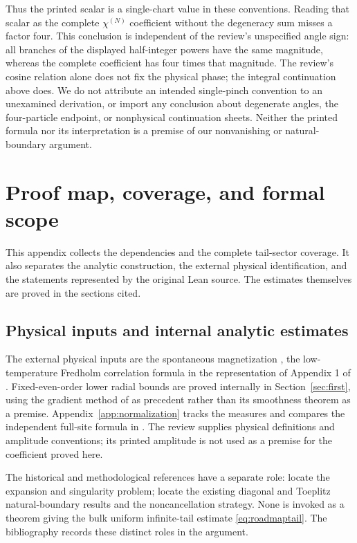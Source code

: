 \documentclass[11pt]{article}
\numberwithin{equation}{section}
\theoremstyle{definition}
\begin{document}
Thus the printed scalar is a single-chart value in these conventions.
Reading that scalar as the complete \(\chi^{(N)}\) coefficient without
the degeneracy sum misses a factor four. This conclusion is independent
of the review's unspecified angle sign: all branches of the displayed
half-integer powers have the same magnitude, whereas the complete
coefficient has four times that magnitude. The review's cosine relation
alone does not fix the physical phase; the integral continuation above
does. We do not attribute an intended single-pinch convention to an
unexamined derivation, or import any conclusion about degenerate angles,
the four-particle endpoint, or nonphysical continuation sheets.
Neither the printed formula nor its interpretation is a premise of
our nonvanishing or natural-boundary argument.



\section{Proof map, coverage, and formal scope}\label{app:auditmap}
This appendix collects the dependencies and the complete tail-sector
coverage. It also separates the analytic construction, the external
physical identification, and the statements represented by the original
Lean source. The estimates themselves are proved in the sections cited.

\subsection{Physical inputs and internal analytic estimates}
The external physical inputs are the spontaneous magnetization
\cite{Yang1952}, the low-temperature Fredholm correlation formula
\cite{PalmerTracy1981} in the representation of Appendix 1 of
\cite{TW2014}. Fixed-even-order lower radial bounds are proved
internally in Section~\ref{sec:first}, using the gradient method of
\cite{TW2014} as precedent rather than its smoothness theorem as a
premise. Appendix~\ref{app:normalization}
tracks the measures and compares the independent full-site formula
in \cite{Boukraa2008}. The review \cite{McCoyMaillard2012}
supplies physical definitions and amplitude conventions; its printed
amplitude is not used as a premise for the coefficient proved here.

The historical and methodological references have a separate role:
\cite{WMTB1976,GuttmannEnting1996,Nickel1999,Nickel2000}
locate the expansion and singularity problem;
\cite{TW2013,TW2017Toeplitz} locate the existing diagonal and
Toeplitz natural-boundary results and the noncancellation strategy.
None is invoked as a theorem giving the bulk uniform infinite-tail
estimate \eqref{eq:roadmaptail}. The bibliography records these distinct roles in the argument.
\end{document}
